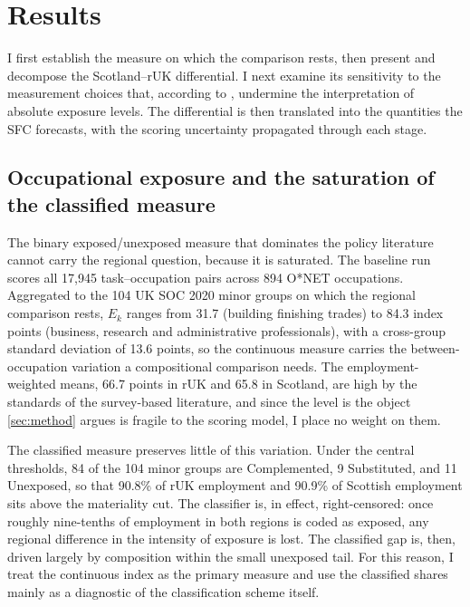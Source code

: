 \section{Results}\label{sec:results}

I first establish the measure on which the comparison rests, then present and decompose the Scotland--rUK differential. I next examine its sensitivity to the measurement choices that, according to \citet{yin2026}, undermine the interpretation of absolute exposure levels. The differential is then translated into the quantities the SFC forecasts, with the scoring uncertainty propagated through each stage.

\subsection{Occupational exposure and the saturation of the classified measure}\label{sec:saturation}
 
The binary exposed/unexposed measure that dominates the policy literature cannot carry the regional question, because it is saturated. The baseline run scores all 17,945 task--occupation pairs across 894 O*NET occupations. Aggregated to the 104 UK SOC 2020 minor groups on which the regional comparison rests, $E_k$ ranges from 31.7 (building finishing trades) to 84.3 index points (business, research and administrative professionals), with a cross-group standard deviation of 13.6 points, so the continuous measure carries the between-occupation variation a compositional comparison needs. The employment-weighted means, 66.7 points in rUK and 65.8 in Scotland, are high by the standards of the survey-based literature, and since the level is the object \cref{sec:method} argues is fragile to the scoring model, I place no weight on them.
 
The classified measure preserves little of this variation. Under the central thresholds, 84 of the 104 minor groups are Complemented, 9 Substituted, and 11 Unexposed, so that 90.8\% of rUK employment and 90.9\% of Scottish employment sits above the materiality cut. The classifier is, in effect, right-censored: once roughly nine-tenths of employment in both regions is coded as exposed, any regional difference in the intensity of exposure is lost. The classified gap is, then, driven largely by composition within the small unexposed tail. For this reason, I treat the continuous index as the primary measure and use the classified shares mainly as a diagnostic of the classification scheme itself.
 
